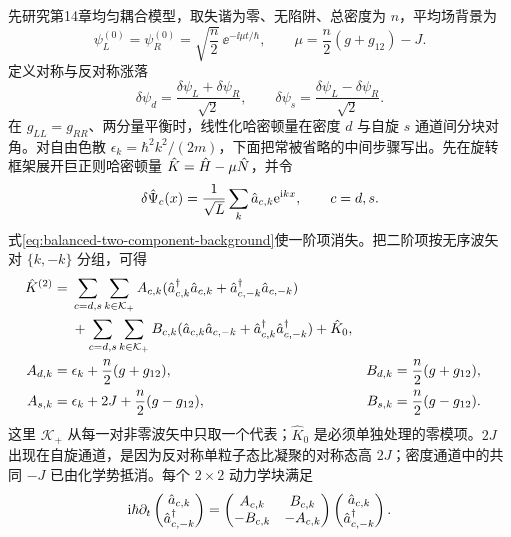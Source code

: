 先研究第14章均匀耦合模型，取失谐为零、无陷阱、总密度为 $n$，平均场背景为
\begin{equation}
  \psi_L^{(0)}=\psi_R^{(0)}=\sqrt{\frac n2}\,\ee^{-\ii\mu t/\hbar},
  \qquad
  \mu=\frac n2(g+g_{12})-J.
  \label{eq:balanced-two-component-background}
\end{equation}
定义对称与反对称涨落
\begin{equation}
  \delta\psi_d=\frac{\delta\psi_L+\delta\psi_R}{\sqrt2},
  \qquad
  \delta\psi_s=\frac{\delta\psi_L-\delta\psi_R}{\sqrt2}.
  \label{eq:density-spin-fluctuations}
\end{equation}
在 $g_{LL}=g_{RR}$、两分量平衡时，线性化哈密顿量在密度 $d$ 与自旋 $s$ 通道间分块对角。对自由色散
$\epsilon_k=\hbar^2k^2/(2m)$，下面把常被省略的中间步骤写出。先在旋转框架展开巨正则哈密顿量
$\hat K=\hat H-\mu\hat N$，并令
\begin{equation}
  \delta\hat\Psi_c(x)=\frac1{\sqrt L}\sum_k\hat a_{c,k}\mathrm{e}^{\mathrm{i} kx},
  \qquad c=d,s.
  \label{eq:density-spin-fourier-expansion}
\end{equation}
式\eqref{eq:balanced-two-component-background}使一阶项消失。把二阶项按无序波矢对 $\{k,-k\}$ 分组，可得
\begin{align}
  \hat K^{(2)}={}&\sum_{c=d,s}\sum_{k\in\mathcal K_+}
  A_{c,k}(\hat a^{\dagger}_{c,k}\hat a_{c,k}+\hat a^{\dagger}_{c,-k}\hat a_{c,-k})\notag\\
  &+\sum_{c=d,s}\sum_{k\in\mathcal K_+}
  B_{c,k}(\hat a_{c,k}\hat a_{c,-k}+\hat a^{\dagger}_{c,k}\hat a^{\dagger}_{c,-k})+\hat K_0,
  \label{eq:two-component-quadratic-pairs}\\
  A_{d,k}={}&\epsilon_k+\frac n2(g+g_{12}),
  &B_{d,k}={}&\frac n2(g+g_{12}),
  \label{eq:density-ab-coefficients}\\
  A_{s,k}={}&\epsilon_k+2J+\frac n2(g-g_{12}),
  &B_{s,k}={}&\frac n2(g-g_{12}).
  \label{eq:spin-ab-coefficients}
\end{align}
这里 $\mathcal K_+$ 从每一对非零波矢中只取一个代表；$\hat K_0$ 是必须单独处理的零模项。$2J$ 出现在自旋通道，是因为反对称单粒子态比凝聚的对称态高 $2J$；密度通道中的共同 $-J$ 已由化学势抵消。每个 $2\times2$ 动力学块满足
\begin{equation}
  \mathrm{i}\hbar\partial_t
  \begin{pmatrix}\hat a_{c,k}\\ \hat a^{\dagger}_{c,-k}\end{pmatrix}
  =
  \begin{pmatrix}A_{c,k}&B_{c,k}\\-B_{c,k}&-A_{c,k}\end{pmatrix}
  \begin{pmatrix}\hat a_{c,k}\\ \hat a^{\dagger}_{c,-k}\end{pmatrix}.
  \label{eq:channel-bdg-dynamical-block}
\end{equation}
